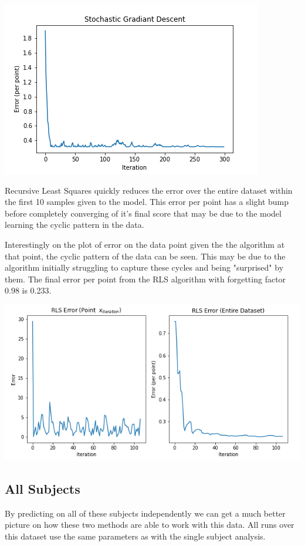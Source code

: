 \documentclass[sigconf]{acmart}
\begin{document}
\begin{center}
    \includegraphics[width=\linewidth]{figs/Parks SGD single.png}
\end{center}

Recursive Least Squares quickly reduces the error over the entire dataset within the first 10 samples given to the model. This error per point has a slight bump before completely converging of it's final score that may be due to the model learning the cyclic pattern in the data.

Interestingly on the plot of error on the data point given the the algorithm at that point, the cyclic pattern of the data can be seen. This may be due to the algorithm initially struggling to capture these cycles and being "surprised" by them.
The final error per point from the RLS algorithm with forgetting factor 0.98 is 0.233.

\begin{center}
    \includegraphics[width=\linewidth]{figs/Parks RLS single.png}
\end{center}
\subsection{All Subjects}
By predicting on all of these subjects independently we can get a much better picture on how these two methods are able to work with this data.
All runs over this dataset use the same parameters as with the single subject analysis.
\end{document}

